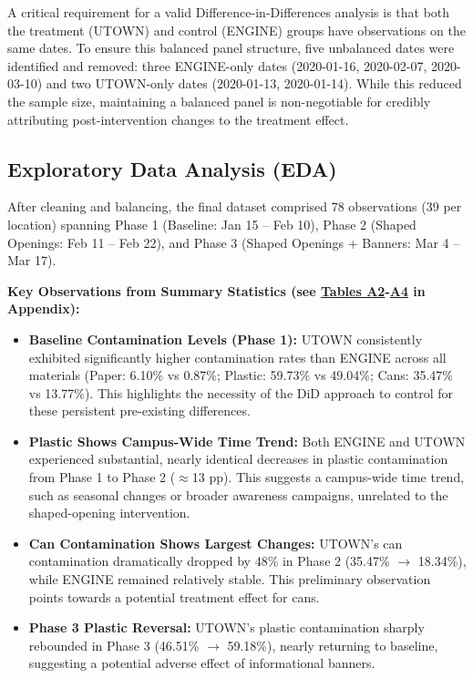 \documentclass[12pt]{article}
\begin{document}
A critical requirement for a valid Difference-in-Differences analysis is that both the treatment (UTOWN) and control (ENGINE) groups have observations on the same dates. To ensure this balanced panel structure, five unbalanced dates were identified and removed: three ENGINE-only dates (2020-01-16, 2020-02-07, 2020-03-10) and two UTOWN-only dates (2020-01-13, 2020-01-14). While this reduced the sample size, maintaining a balanced panel is non-negotiable for credibly attributing post-intervention changes to the treatment effect.

\subsection{Exploratory Data Analysis (EDA)}

After cleaning and balancing, the final dataset comprised 78 observations (39 per location) spanning Phase 1 (Baseline: Jan 15 -- Feb 10), Phase 2 (Shaped Openings: Feb 11 -- Feb 22), and Phase 3 (Shaped Openings + Banners: Mar 4 -- Mar 17).

\textbf{Key Observations from Summary Statistics (see \hyperref[tab:paper]{Tables A2}-\hyperref[tab:cans]{A4} in Appendix):}

\begin{itemize}
    \item \textbf{Baseline Contamination Levels (Phase 1):} UTOWN consistently exhibited significantly higher contamination rates than ENGINE across all materials (Paper: 6.10\% vs 0.87\%; Plastic: 59.73\% vs 49.04\%; Cans: 35.47\% vs 13.77\%). This highlights the necessity of the DiD approach to control for these persistent pre-existing differences.

    \item \textbf{Plastic Shows Campus-Wide Time Trend:} Both ENGINE and UTOWN experienced substantial, nearly identical decreases in plastic contamination from Phase 1 to Phase 2 ($\approx$13 pp). This suggests a campus-wide time trend, such as seasonal changes or broader awareness campaigns, unrelated to the shaped-opening intervention.

    \item \textbf{Can Contamination Shows Largest Changes:} UTOWN's can contamination dramatically dropped by 48\% in Phase 2 (35.47\% $\rightarrow$ 18.34\%), while ENGINE remained relatively stable. This preliminary observation points towards a potential treatment effect for cans.

    \item \textbf{Phase 3 Plastic Reversal:} UTOWN's plastic contamination sharply rebounded in Phase 3 (46.51\% $\rightarrow$ 59.18\%), nearly returning to baseline, suggesting a potential adverse effect of informational banners.
\end{itemize}
\end{document}

